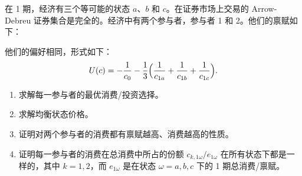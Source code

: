 \par\noindent
\begin{minipage}{\linewidth}
\begin{problem}
 在 1 期，经济有三个等可能的状态 $a$、$b$ 和 $c$。在证券市场上交易的 Arrow-Debreu 证券集合是完全的。经济中有两个参与者，参与者 1 和 2。他们的禀赋如下：
\begin{center}
\qquad
{}
\end{center}
他们的偏好相同，形式如下：
\[
    U(c)=-\frac{1}{c_{0}}-\frac13\Bigl(\frac{1}{c_{1a}}+\frac{1}{c_{1b}}+\frac{1}{c_{1c}}\Bigr).
\]
\begin{enumerate}[label=(\alph*)]
    \item 求解每一参与者的最优消费/投资选择。
    \item 求解均衡状态价格。
    \item 证明对两个参与者的消费都有禀赋越高、消费越高的性质。
    \item 证明每一参与者的消费在总消费中所占的份额 $c_{k,1\omega}/e_{1\omega}$ 在所有状态下都是一样的，其中 $k=1,2$，而 $e_{1\omega}$ 是在状态 $\omega=a,b,c$ 下的 1 期总消费/禀赋。
\end{enumerate}
\end{problem}
\end{minipage}\par
